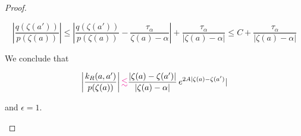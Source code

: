 \documentclass{article}
\theoremstyle{plain}
\newcommand{\volterra}{\mathcal{V}}
\newcommand{\hardpart}{\mathcal{V}_0}
\newcommand{\softpart}{\mathcal{V}_\star}
\begin{document}
\begin{proof}
\begin{enumerate}
\[    \left\vert \frac{q(\zeta(a'))}{p(\zeta(a))}\right\vert  \leq \left\vert \frac{q(\zeta(a'))}{p(\zeta(a))} -\frac{\tau_\alpha}{\zeta(a)-\alpha}\right\vert + \frac{\tau_\alpha}{|\zeta(a)-\alpha|}\leq C +  \frac{\tau_\alpha}{|\zeta(a)-\alpha|} \]

We conclude that 

\[\left\vert \frac{k_R(a,a')}{p(\zeta(a))}\right\vert\textcolor{magenta}{\lesssim} \frac{|\zeta(a)-\zeta(a')|}{|\zeta(a)-\alpha|}\, e^{2A |\zeta(a)-\zeta(a')} | \]

and $\epsilon=1$.

\end{enumerate}



\end{proof}





\end{document}
